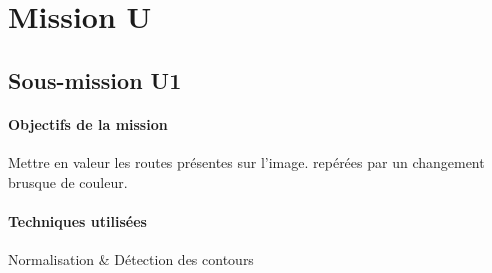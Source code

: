 \section{Mission U}
\subsection{Sous-mission U1}

	\begin{vwcol}[widths={0.65,0.2}, rule=0pt]
	\begin{minipage}{0.7\textwidth}
	\paragraph{Objectifs de la mission}

	Mettre en valeur les routes présentes sur l'image. repérées par un changement brusque de couleur.
	\end{minipage}

	\begin{minipage}{0.3\textwidth}
	\begin{flushright}
	\paragraph{Techniques utilisées}

	Normalisation \& Détection des contours
	\end{flushright}
	\end{minipage}

	\end{vwcol} 

